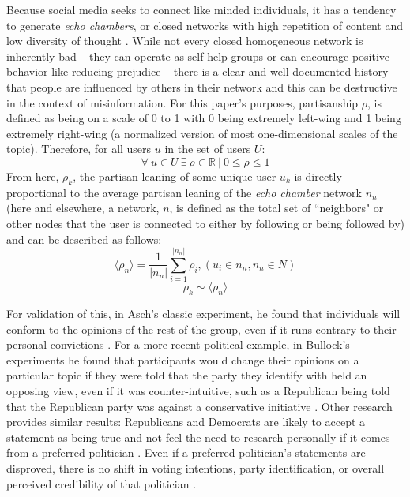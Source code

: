 \documentclass[preprint,review,12pt]{elsarticle}
\begin{document}
Because social media seeks to connect like minded individuals, it has a tendency to generate \textit{echo chambers}, or closed networks with high repetition of content and low diversity of thought \cite{adibi2005proceedings, bastian2009international, pariser2011filter,bozdag2015breaking}. While not every closed homogeneous network is inherently bad -- they can operate as self-help groups \cite{kast2012under} or can encourage positive behavior like reducing prejudice \cite{paluck2011peer} -- there is a clear and well documented history that people are influenced by others in their network \cite{cialdini2004social,bollinger2012peer, bond201261,gerber2008social,gerber2009descriptive,meer2011brother,paluck2012salience,del2016spreading,bessi2015viral,friedkin1984structural,marsden1993network} and this can be destructive in the context of misinformation. For this paper's purposes, partisanship $\rho$, is defined as being on a scale of 0 to 1 with 0 being extremely left-wing and 1 being extremely right-wing (a normalized version of most one-dimensional scales of the topic). Therefore, for all users $u$ in the set of users $U$:
\begin{equation}
\label{basepartisanship}
    \forall \ u \in U \ \exists \ \rho \in \mathbb{R} \ | \ 0 \leq \rho \leq 1
\end{equation}
From here, $\rho_k$, the partisan leaning of some unique user $u_k$ is directly proportional to the average partisan leaning of the \textit{echo chamber} network $n_n$ (here and elsewhere, a network, $n$, is defined as the total set of ``neighbors" or other nodes that the user is connected to either by following or being followed by) and can be described as follows:
 \begin{equation}
    \label{ech chamber}
        \langle \rho_n \rangle = \frac{1}{|n_n|}\sum_{i=1}^{|n_n|}{\rho_i}, (u_i \in n_n, n_n \in N)
 \end{equation}
 \begin{equation}
    \label{leaningproportionaltonetwork}
        \rho_k \sim \langle \rho_n \rangle
 \end{equation}
 
 For validation of this, in Asch's classic experiment, he found that individuals will conform to the opinions of the rest of the group, even if it runs contrary to their personal convictions \cite{asch1956studies}. For a more recent political example, in Bullock's experiments he found that participants would change their opinions on a particular topic if they were told that the party they identify with held an opposing view, even if it was counter-intuitive, such as a Republican being told that the Republican party was against a conservative initiative \cite{bullock2007experiments}. Other research provides similar results: Republicans and Democrats are likely to accept a statement as being true and not feel the need to research personally if it comes from a preferred politician \cite{housholder2014facebook}. Even if a preferred politician's statements are disproved, there is no shift in voting intentions, party identification, or overall perceived credibility of that politician \cite{swire2017processing}. 
 
\end{document}
